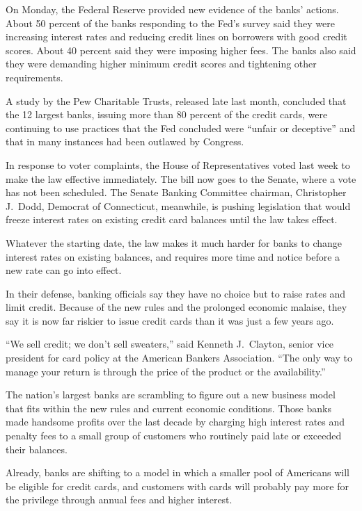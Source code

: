 ﻿\documentclass[12pt]{article}
\begin{document}
On Monday, the Federal Reserve provided new evidence of the banks' actions. About 50 percent of the
banks responding to the Fed's survey said they were increasing interest rates and reducing credit
lines on borrowers with good credit scores. About 40 percent said they were imposing higher fees.
The banks also said they were demanding higher minimum credit scores and tightening other
requirements.

A study by the Pew Charitable Trusts, released late last month, concluded that the 12 largest banks,
issuing more than 80 percent of the credit cards, were continuing to use practices that the Fed
concluded were ``unfair or deceptive'' and that in many instances had been outlawed by Congress.

In response to voter complaints, the House of Representatives voted last week to make the law
effective immediately. The bill now goes to the Senate, where a vote has not been scheduled. The
Senate Banking Committee chairman, Christopher J.~Dodd, Democrat of Connecticut, meanwhile, is
pushing legislation that would freeze interest rates on existing credit card balances until the law
takes effect.

Whatever the starting date, the law makes it much harder for banks to change interest rates on
existing balances, and requires more time and notice before a new rate can go into effect.

In their defense, banking officials say they have no choice but to raise rates and limit credit.
Because of the new rules and the prolonged economic malaise, they say it is now far riskier to issue
credit cards than it was just a few years ago.

``We sell credit; we don't sell sweaters,'' said Kenneth J.~Clayton, senior vice president for card
policy at the American Bankers Association. ``The only way to manage your return is through the
price of the product or the availability.''

The nation's largest banks are scrambling to figure out a new business model that fits within the
new rules and current economic conditions. Those banks made handsome profits over the last decade by
charging high interest rates and penalty fees to a small group of customers who routinely paid late
or exceeded their balances.

Already, banks are shifting to a model in which a smaller pool of Americans will be eligible for
credit cards, and customers with cards will probably pay more for the privilege through annual fees
and higher interest.
\end{document}
